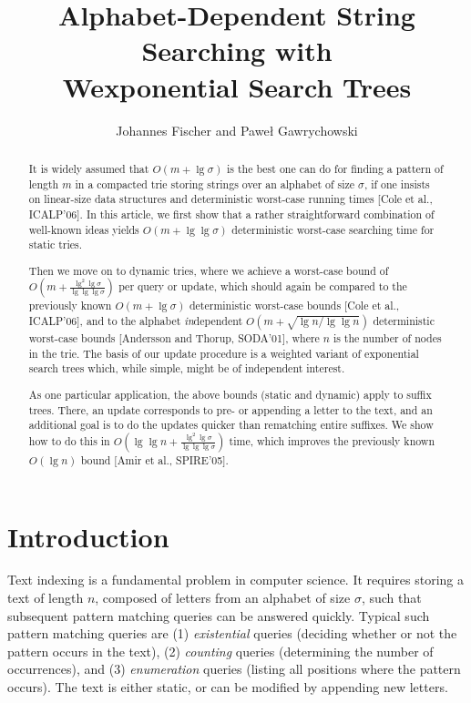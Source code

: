 \documentclass[11pt,onecolumn,final]{article} \usepackage{a4}
\title{Alphabet-Dependent String Searching with \\Wexponential Search Trees}
\author{Johannes Fischer and Pawe{\l} Gawrychowski}
\theoremstyle{plain}
\theoremstyle{remark}
\begin{document}
\maketitle

\begin{abstract}
It is widely assumed that $O(m+\lg \sigma)$ is the best one can do for finding a pattern of length $m$ in a compacted trie storing strings over an alphabet of size $\sigma$, if one insists on linear-size data structures and deterministic worst-case running times [Cole et al., ICALP'06]. In this article, we first show that a rather straightforward combination of well-known ideas yields $O(m+\lg\lg \sigma)$ deterministic worst-case searching time for static tries.


Then we move on to dynamic tries, where we achieve a worst-case bound of $O(m+\frac{\lg^{2}\lg\sigma}{\lg\lg\lg\sigma})$ per query or update, which should again be compared to the previously known $O(m+\lg\sigma)$ deterministic worst-case bounds [Cole et al., ICALP'06], and to the alphabet \emph{in}dependent $O(m+\sqrt{\lg n/\lg\lg n})$ deterministic worst-case bounds [Andersson and Thorup, SODA'01], where $n$ is the number of nodes in the trie. The basis of our update procedure is a weighted variant of exponential search trees which, while simple, might be of independent interest.

As one particular application, the above bounds (static and dynamic) apply to suffix trees. There, an update corresponds to pre- or appending a letter to the text, and an additional goal is to do the updates quicker than rematching entire suffixes. We show how to do this in $O(\lg\lg n + \frac{\lg^{2}\lg\sigma}{\lg\lg\lg\sigma})$ time, which improves the previously known $O(\lg n)$ bound [Amir et al., SPIRE'05].
\end{abstract}

\section{Introduction}
Text indexing is a fundamental problem in computer science. It requires storing a text of length $n$, composed of letters from an alphabet of size $\sigma$, such that subsequent pattern matching queries can be answered quickly. Typical such pattern matching queries are (1) \emph{existential} queries (deciding whether or not the pattern occurs in the text), (2) \emph{counting} queries (determining the number of occurrences), and (3) \emph{enumeration} queries (listing all positions where the pattern occurs). The text is either static, or can be modified by appending new letters.
\end{document}
